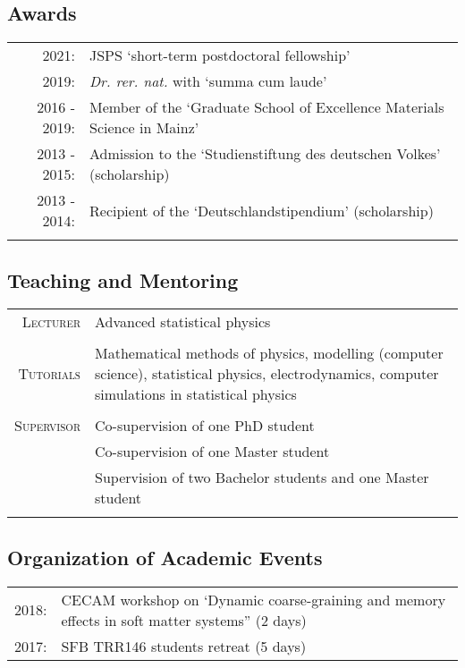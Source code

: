 \subsection*{Awards}
\begin{tabular}{rp{14cm}}
	\textsc{2021:}& JSPS `short-term postdoctoral fellowship'\\
		\textsc{2019:}& \emph{Dr. rer. nat.} with `summa cum laude'\\
\textsc{2016 - 2019:}& {Member of the ‘Graduate School of Excellence Materials Science in Mainz’
 } \\

 \textsc{2013 - 2015:} & {Admission to the ‘Studienstiftung des deutschen Volkes’ (scholarship)} \\

\textsc{2013 - 2014:}& {Recipient of the ‘Deutschlandstipendium’ (scholarship)
}
\\\multicolumn{2}{c}{}\\
	
\end{tabular}

\subsection*{Teaching and Mentoring}
\begin{tabular}{r|p{13cm}}
	\textsc{Lecturer}& {Advanced statistical physics
	} 
	\\\multicolumn{2}{c}{}\\
	\textsc{Tutorials}& Mathematical methods of physics, modelling (computer science), statistical
	physics, electrodynamics, computer simulations in statistical physics
	\\\multicolumn{2}{c}{}\\
	
	\textsc{Supervisor}& {Co-supervision of one PhD student}\\
	& {Co-supervision of one Master student}\\
	& {Supervision of two Bachelor students and one Master student}
	\\\multicolumn{2}{c}{}\\	
\end{tabular}

\subsection*{Organization of Academic Events}

	\begin{tabular}{rl}
			2018: & CECAM workshop on ‘Dynamic coarse-graining and memory effects in soft matter systems” (2 days)\\
	2017: & SFB TRR146 students retreat (5 days)
	 
\end{tabular}

